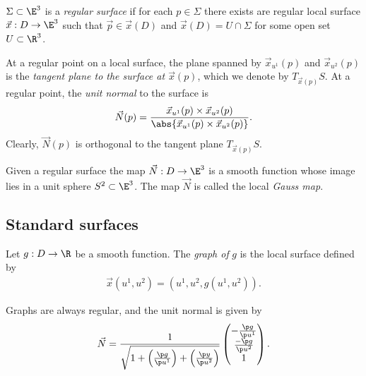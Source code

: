 \documentclass{article}
\begin{document}
\begin{definition}
    $\Sigma\subset\E^3$ is a \emph{regular surface} if for each $p\in\Sigma$ there
    exists are regular local surface $\vec x:D\to\E^3$ such that $\vec p\in\vec x(D)$
    and $\vec x(D)=U\cap\Sigma$ for some open set $U\subset\R^3$.
\end{definition}

\begin{definition}
    At a regular point on a local surface, the plane spanned by $\vec x_{u^1}(p)$ 
    and $\vec x_{u^2}(p)$ is the \emph{tangent plane to the surface at $\vec x(p)$},
    which we denote by $T_{\vec x(p)}S$. At a regular point, the \emph{unit normal}
    to the surface is 
    \begin{align*}
        \vec N(p)=\frac{\vec x_{u^1}(p)\times\vec x_{u^2}(p)}{\abs{\vec x_{u^1}(p)\times\vec x_{u^2}(p)}}.
    \end{align*}
    Clearly, $\vec N(p)$ is orthogonal to the tangent plane $T_{\vec x(p)}S$.
\end{definition}

\begin{proposition}
    Given a regular surface the map $\vec N:D\to\E^3$ is a smooth function whose
    image lies in a unit sphere $S^2\subset\E^3$. The map $\vec N$ is called the
    local \emph{Gauss map}.
\end{proposition}

\subsection{Standard surfaces}

\begin{definition}
    Let $g:D\to\R$ be a smooth function. The \emph{graph of} $g$ is the local surface 
    defined by 
    \begin{align*}
        \vec x(u^1, u^2) = (u^1, u^2, g(u^1, u^2)).
    \end{align*}
\end{definition}

\begin{proposition}
    Graphs are always regular, and the unit normal is given by
    \begin{align*}
        \vec N = \frac{1}{\sqrt{1 + \left(\frac{\p g}{\p u^1}\right) + \left(\frac{\p y}{\p u^2}\right)}}\begin{pmatrix}
            -\frac{\p g}{\p u^1} \\ \frac{-\p g}{\p u^2} \\ 1
        \end{pmatrix}.
    \end{align*}
\end{proposition}
\end{document}
